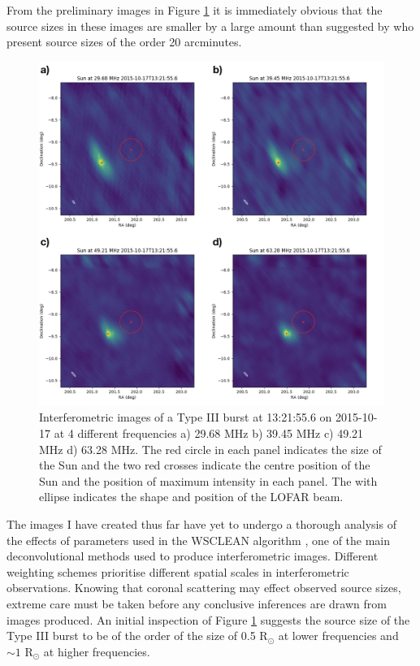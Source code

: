 From the preliminary images in Figure \ref{fig:typeIIIcomp} it is immediately obvious that the source sizes in these images are smaller by a large amount than suggested by \cite{Kontar2017} who present source sizes of the order 20 arcminutes. %
\begin{figure}[t]
    \centering
    \includegraphics[width=0.75\columnwidth]{Images/TypeIII_comparison.png}
    \caption[Interferometric images of a Type III burst]{Interferometric images of a Type III burst at 13:21:55.6 on 2015-10-17 at 4 different frequencies a) 29.68 MHz b) 39.45 MHz c) 49.21 MHz d) 63.28 MHz. The red circle in each panel indicates the size of the Sun and the two red crosses indicate the centre position of the Sun and the position of maximum intensity in each panel. The with ellipse indicates the shape and position of the LOFAR beam.}
    \label{fig:typeIIIcomp}
\end{figure}

The images I have created thus far have yet to undergo a thorough analysis of the effects of parameters used in the WSCLEAN algorithm \citep{Offringa2014}, one of the main deconvolutional methods used to produce interferometric images. Different weighting schemes prioritise different spatial scales in interferometric observations. Knowing that coronal scattering may effect observed source sizes, extreme care must be taken before any conclusive inferences are drawn from images produced. An initial inspection of Figure \ref{fig:typeIIIcomp} suggests the source size of the Type III burst to be of the order of the size of 0.5 R$_{\odot}$ at lower frequencies and $\sim 1 \mbox{ R}_\odot$ at higher frequencies. 










